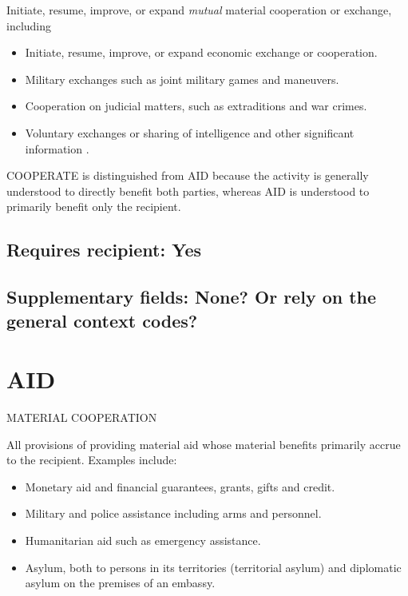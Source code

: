 \documentclass[11pt]{report}
\newcommand{\plcat}[1]{\textsf{#1}}
\newcommand{\ti}[1]{\textit{#1}}
\begin{document}
Initiate, resume, improve, or expand \ti{mutual} material cooperation or exchange, including

\begin{itemize}
\item Initiate, resume, improve, or expand economic exchange or cooperation.

\item Military exchanges such as joint military games and maneuvers.

\item Cooperation on judicial matters, such as extraditions and war crimes.

\item Voluntary exchanges or sharing of intelligence and other significant information .

\end{itemize}

\noindent \plcat{COOPERATE} is distinguished from \plcat{AID} because the activity is generally understood to directly benefit both parties, whereas  \plcat{AID} is understood to primarily benefit only the recipient. 

\subsection{Requires recipient: Yes}

\subsection{Supplementary fields: None? Or rely on the general context codes?}


\newpage

\section{AID}

\textsf{MATERIAL COOPERATION} \vspace{8pt}

All provisions of providing material aid whose material benefits primarily accrue to the recipient. Examples include: 

\begin{itemize}

\item Monetary aid and financial guarantees, grants, gifts and credit.

\item Military and police assistance including arms and personnel.

\item Humanitarian aid such as emergency assistance.

\item Asylum, both to persons in its territories (territorial asylum) and diplomatic asylum on the premises of an embassy.

\end{itemize}
\end{document}
